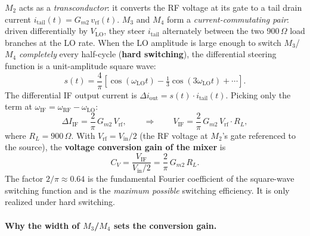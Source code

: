 $M_2$ acts as a \emph{transconductor}: it converts the RF voltage at its gate
to a tail drain current $i_\text{tail}(t) = G_{m2}\,v_\text{rf}(t)$.
$M_3$ and $M_4$ form a \emph{current-commutating pair}: driven
differentially by $V_\text{LO}$, they steer $i_\text{tail}$ alternately
between the two 900\,$\Omega$ load branches at the LO rate.  When the LO
amplitude is large enough to switch $M_{3}$/$M_4$ \emph{completely} every
half-cycle (\textbf{hard switching}), the differential steering function is
a unit-amplitude square wave:
\[
  s(t) = \frac{4}{\pi}\!\left[\cos(\omega_\text{LO}t)
         - \tfrac{1}{3}\cos(3\omega_\text{LO}t) + \cdots\right].
\]
The differential IF output current is $\Delta i_\text{out} = s(t)\cdot i_\text{tail}(t)$.
Picking only the term at $\omega_\text{IF} = \omega_\text{RF}-\omega_\text{LO}$:
\[
  \Delta I_\text{IF} = \frac{2}{\pi}\,G_{m2}\,V_\text{rf},
  \qquad\Rightarrow\qquad
  V_\text{IF} = \frac{2}{\pi}\,G_{m2}\,V_\text{rf}\cdot R_L,
\]
where $R_L = 900\,\Omega$.  With $V_\text{rf} = V_\text{in}/2$
(the RF voltage at $M_2$'s gate referenced to the source), the
\textbf{voltage conversion gain of the mixer} is
\begin{equation}\label{eq:CG}
  \boxed{C_V = \frac{V_\text{IF}}{V_\text{in}/2}
             = \frac{2}{\pi}\,G_{m2}\,R_L.}
\end{equation}
The factor $2/\pi\approx 0.64$ is the fundamental Fourier coefficient of the
square-wave switching function and is the \emph{maximum possible} switching
efficiency.  It is only realized under hard switching.

\paragraph{Why the width of $M_3$/$M_4$ sets the conversion gain.}

